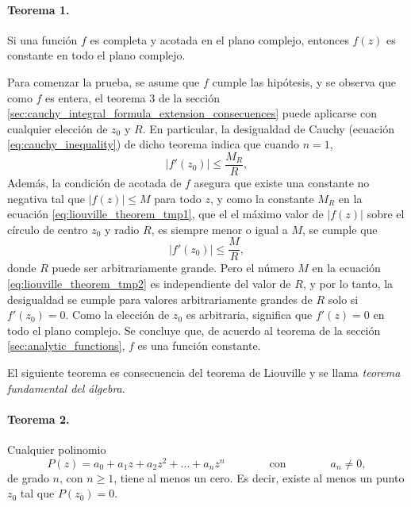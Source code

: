 \documentclass[a4paper]{report}
\begin{document}
\paragraph{Teorema 1.} Si una función \(f\) es completa y acotada en el plano complejo, entonces \(f(z)\) es constante en todo el plano complejo.

Para comenzar la prueba, se asume que \(f\) cumple las hipótesis, y se observa que como \(f\) es entera, el teorema 3 de la sección \ref{sec:cauchy_integral_formula_extension_consecuences} puede aplicarse con cualquier elección de \(z_0\) y \(R\). En particular, la desigualdad de Cauchy (ecuación \ref{eq:cauchy_inequality}) de dicho teorema indica que cuando \(n=1\),
\begin{equation}\label{eq:liouville_theorem_tmp1}
 |f'(z_0)|\leq\frac{M_R}{R}, 
\end{equation}
Además, la condición de acotada de \(f\) asegura que existe una constante no negativa tal que \(|f(z)|\leq M\) para todo \(z\), y como la constante \(M_R\) en la ecuación \ref{eq:liouville_theorem_tmp1}, que el el máximo valor de \(|f(z)|\) sobre el círculo de centro \(z_0\) y radio \(R\), es siempre menor o igual a \(M\), se cumple que 
\begin{equation}\label{eq:liouville_theorem_tmp2}
 |f'(z_0)|\leq\frac{M}{R}, 
\end{equation}
donde \(R\) puede ser arbitrariamente grande. Pero el número \(M\) en la ecuación \ref{eq:liouville_theorem_tmp2} es independiente del valor de \(R\), y por lo tanto, la desigualdad se cumple para valores arbitrariamente grandes de \(R\) solo si \(f'(z_0)=0\). Como la elección de \(z_0\) es arbitraria, significa que \(f'(z)=0\) en todo el plano complejo. Se concluye que, de acuerdo al teorema de la sección \ref{sec:analytic_functions}, \(f\) es una función constante.

El siguiente teorema es consecuencia del teorema de Liouville y se llama \emph{teorema fundamental del álgebra}.

\paragraph{Teorema 2.} Cualquier polinomio
\[
 P(z)=a_0+a_1z+a_2z^2+\dots+a_nz^n
 \qquad\qquad\textrm{con}\qquad\qquad 
 a_n\neq0,
\]
de grado \(n\), con \(n\geq1\), tiene al menos un cero. Es decir, existe al menos un punto \(z_0\) tal que \(P(z_0)=0\).
\end{document}
